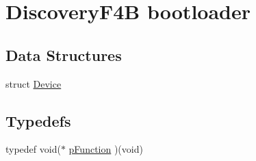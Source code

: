 \hypertarget{group___discovery_f4_b_l}{\section{\-Discovery\-F4\-B bootloader}
\label{group___discovery_f4_b_l}
}
\subsection*{\-Data \-Structures}
\begin{DoxyCompactItemize}
\item 
struct \hyperlink{struct_device}{\-Device}
\end{DoxyCompactItemize}
\subsection*{\-Typedefs}
\begin{DoxyCompactItemize}
\item 
typedef void($\ast$ \hyperlink{group___discovery_f4_b_l_ga9227bf1f1a9c633a0cc9ca50cc761c1a}{p\-Function} )(void)
\end{DoxyCompactItemize}
